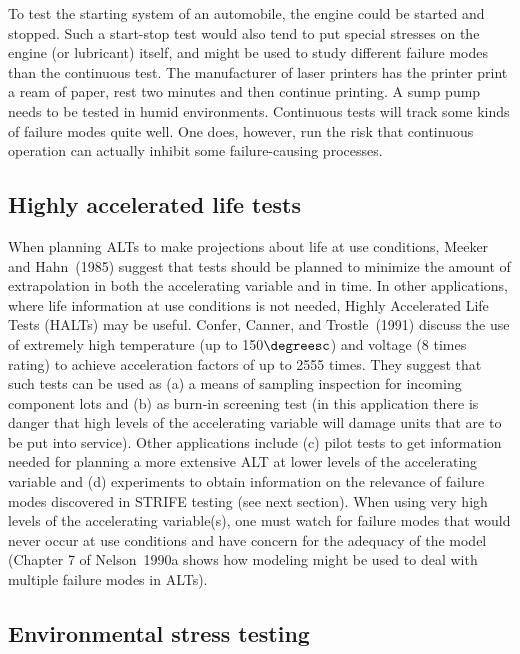To test the starting system of an
automobile, the engine could be started and stopped. Such a
start-stop test would also tend to put special stresses on the
engine (or lubricant) itself, and might be used to study different
failure modes than the continuous test.  
The manufacturer of laser printers has the printer print a ream of
paper, rest two minutes and then continue printing. A sump pump
needs to be tested in humid environments. Continuous tests will
track some kinds of failure modes quite well. One does, however, run
the risk that continuous operation can actually inhibit some
failure-causing processes.

\subsection{Highly accelerated life tests}

When planning ALTs to make projections about life at use conditions,
Meeker and Hahn~(1985) suggest that tests should be planned to
minimize the amount of extrapolation in both the accelerating
variable and in time. In other applications, where life information
at use conditions is not needed, Highly Accelerated Life Tests
(HALTs) may be useful. Confer, Canner, and Trostle~(1991) discuss
the use of extremely high temperature (up to 150$\degreesc$) and
voltage (8 times rating) to achieve acceleration factors of up to
2555 times.  They suggest that such tests can be used as (a) a means
of sampling inspection for incoming component lots and (b) as
burn-in screening test (in this application there is danger that
high levels of the accelerating variable will damage units that are
to be put into service).  Other applications include (c) pilot tests
to get information needed for planning a more extensive ALT at lower
levels of the accelerating variable and (d) experiments to obtain
information on the relevance of failure modes discovered in STRIFE
testing (see next section).  When using very high levels of the
accelerating variable(s), one must watch for failure modes that
would never occur at use conditions and have concern for the
adequacy of the model (Chapter 7 of Nelson~1990a shows how modeling
might be used to deal with multiple failure modes in ALTs).


\subsection{Environmental stress testing}

